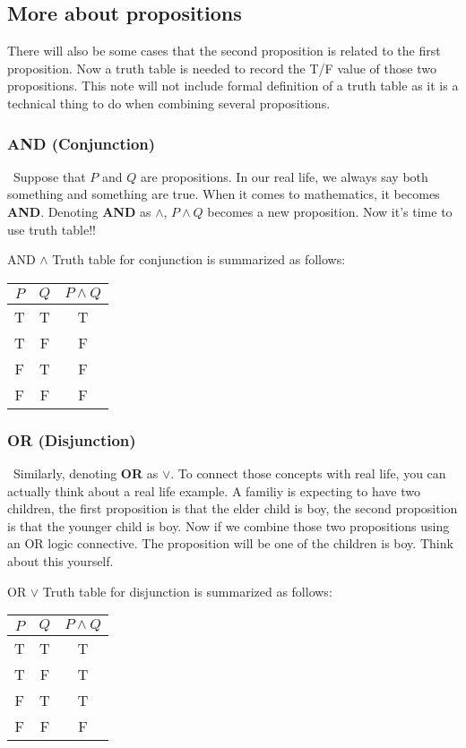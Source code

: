 \documentclass{article}
\begin{document}
\subsection{More about propositions}
\quad There will also be some cases that the second proposition is related to the first proposition.
Now a truth table is needed to record the T/F value of those two propositions. This note will not include
formal definition of a truth table as it is a technical thing to do when combining several propositions.
\subsubsection{AND (Conjunction)}
\quad\ Suppose that $P$ and $Q$ are propositions. In our real life, we always say both something and something
are true. When it comes to mathematics, it becomes \textbf{AND}. Denoting \textbf{AND} as $\land$, $P \land Q$
becomes a new proposition. Now it's time to use truth table!!\\
\begin{defin}{AND $\land$}
    Truth table for conjunction is summarized as follows:
\begin{center}
\begin{tabular}{|c|c|c|}
    \hline
    $P$ & $Q$ & $P \land Q$ \\ \hline
    T   & T  & T  \\ \hline
    T   & F  & F  \\ \hline
    F   & T  & F  \\ \hline
    F   & F  & F  \\ \hline
\end{tabular}
\end{center}
\end{defin}
\subsubsection{OR (Disjunction)}
\quad\ Similarly, denoting \textbf{OR} as $\lor$. To connect those concepts with real life, you can actually
think about a real life example. A familiy is expecting to have two children, the first proposition is that the
elder child is boy, the second proposition is that the younger child is boy. Now if we combine those two propositions
using an OR logic connective. The proposition will be one of the children is boy. Think about this yourself.
\begin{defin}{OR $\lor$}
    Truth table for disjunction is summarized as follows:
\begin{center}
\begin{tabular}{|c|c|c|}
    \hline
    $P$ & $Q$ & $P \land Q$ \\ \hline
    T   & T  & T  \\ \hline
    T   & F  & T  \\ \hline
    F   & T  & T  \\ \hline
    F   & F  & F  \\ \hline
\end{tabular}
\end{center}
\end{defin}
\end{document}

